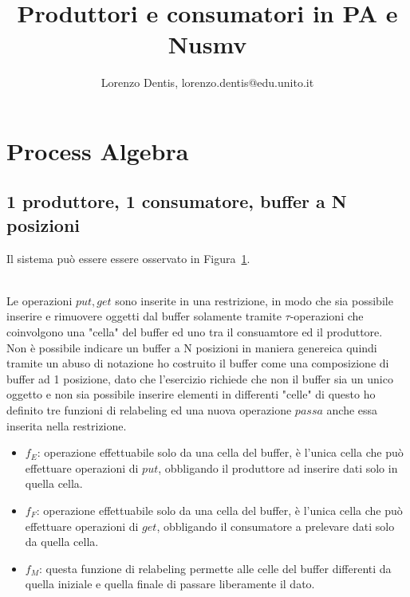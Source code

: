 \documentclass[a4paper]{article}
\begin{document}
\addtolength{\topmargin}{-100pt}
\addtolength{\textheight}{160pt}


\author{Lorenzo Dentis, lorenzo.dentis@edu.unito.it}
\title{Produttori e consumatori in PA e Nusmv}
\maketitle
\section{Process Algebra}
\subsection{1 produttore, 1 consumatore, buffer a N posizioni}
\label{SEC:PA_1}
Il sistema può essere essere osservato in Figura~\ref{FIG:ES3Setting1SYS}.\\
\begin{figure}[!ht]
  \label{FIG:ES3Setting1SYS}
\end{figure}\\
Le operazioni $put,get$ sono inserite in una restrizione, in modo che sia possibile inserire e rimuovere oggetti dal buffer solamente tramite $\tau$-operazioni che coinvolgono una "cella" del buffer ed uno tra il consuamtore ed il produttore.\\
Non è possibile indicare un buffer a N posizioni in maniera genereica quindi tramite un abuso di notazione ho costruito il buffer come una composizione di buffer ad 1 posizione, dato che l'esercizio richiede che non il buffer sia un unico oggetto e non sia possibile inserire elementi in differenti "celle" di questo ho definito tre funzioni di relabeling ed una nuova operazione $passa$ anche essa inserita nella restrizione.
\begin{itemize}
	\item $f_E$: operazione effettuabile solo da una cella del buffer, è l'unica cella che può effettuare operazioni di $put$, obbligando il produttore ad inserire dati solo in quella cella.
	\item $f_F$: operazione effettuabile solo da una cella del buffer, è l'unica cella che può effettuare operazioni di $get$, obbligando il consumatore a prelevare dati solo da quella cella.
	\item $f_M$: questa funzione di relabeling permette alle celle del buffer differenti da quella iniziale e quella finale di passare liberamente il dato.
\end{itemize}
\end{document}
